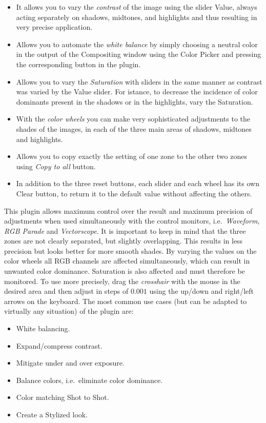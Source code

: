 \begin{itemize}
    \item It allows you to vary the \textit{contrast} of the image using the slider Value, always acting separately on shadows, midtones, and highlights and thus resulting in very precise application.
    \item Allows you to automate the \textit{white balance} by simply choosing a neutral color in the output of the Compositing window using the Color Picker and pressing the corresponding button in the plugin.
    \item Allows you to vary the \textit{Saturation} with sliders in the same manner as contrast was varied by the Value slider. For istance, to decrease the incidence of color dominants present in the shadows or in the highlights, vary the Saturation.
    \item With the \textit{color wheels} you can make very sophisticated adjustments to the shades of the images, in each of the three main areas of shadows, midtones and highlights.
    \item Allows you to copy exactly the setting of one zone to the other two zones using \textit{Copy to all} button.
    \item In addition to the three reset buttons, each slider and each wheel has its own Clear button, to return it to the default value without affecting the others.
\end{itemize}

This plugin allows maximum control over the result and maximum precision of adjustments when used simultaneously with the control monitors, i.e.\ \textit{Waveform}, \textit{RGB Parade} and \textit{Vectorscope}. It is important to keep in mind that the three zones are not clearly separated, but slightly overlapping. This results in less precision but looks better for more smooth shades. By varying the values on the color wheels all RGB channels are affected simultaneously, which can result in unwanted color dominance. Saturation is also affected and must therefore be monitored.
To use more precisely, drag the \textit{crosshair} with the mouse in the desired area and then adjust in steps of $0.001$ using the up/down and right/left arrows on the keyboard.
The most common use cases (but can be adapted to virtually any situation) of the plugin are:

\begin{itemize}
    \item White balancing.
    \item Expand/compress contrast.
    \item Mitigate under and over exposure.
    \item Balance colors, i.e.\ eliminate color dominance.
    \item Color matching Shot to Shot.
    \item Create a Stylized look.
\end{itemize}

